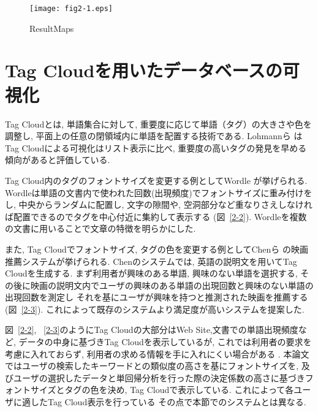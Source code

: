 \documentclass[sotsuron]{kuee}
\begin{document}

\begin{figure}
  \begin{center}
    \unitlength=1mm
   \texttt{[image: fig2-1.eps]}
  \end{center}
  \caption{ResultMaps}
  \label{2-1}
\end{figure}

\section{Tag Cloudを用いたデータベースの可視化}

Tag Cloudとは, 単語集合に対して, 重要度に応じて単語（タグ）の大きさや色を調整し, 平面上の任意の閉領域内に単語を配置する技術である.
Lohmannら
\cite{1-2}はTag Cloudによる可視化はリスト表示に比べ, 重要度の高いタグの発見を早める傾向があると評価している.

Tag Cloud内のタグのフォントサイズを変更する例としてWordle
\cite{2.2-3}が挙げられる.
Wordleは単語の文書内で使われた回数(出現頻度)でフォントサイズに重み付けをし, 中央からランダムに配置し,
文字の隙間や, 空洞部分など重なりさえしなければ配置できるのでタグを中心付近に集約して表示する
(図~\ref{2-2}).
Wordleを複数の文書に用いることで文章の特徴を明らかにした.

また, Tag Cloudでフォントサイズ, タグの色を変更する例としてChenら
\cite{2.2-2}の映画推薦システムが挙げられる.
Chenのシステムでは, 英語の説明文を用いてTag Cloudを生成する.
まず利用者が興味のある単語, 興味のない単語を選択する, その後に映画の説明文内でユーザの興味のある単語の出現回数と興味のない単語の出現回数を測定し
それを基にユーザが興味を持つと推測された映画を推薦する(図~\ref{2-3}). これによって既存のシステムより満足度が高いシステムを提案した.

図~\ref{2-2}, ~\ref{2-3}のようにTag Cloudの大部分はWeb Site,文書での単語出現頻度など, データの中身に基づきTag Cloudを表示しているが,
これでは利用者の要求を考慮に入れておらず, 利用者の求める情報を手に入れにくい場合がある
\cite{2.2-4}.
本論文ではユーザの検索したキーワードとの類似度の高さを基にフォントサイズを,
及びユーザの選択したデータと単回帰分析を行った際の決定係数の高さに基づきフォントサイズとタグの色を決め, Tag Cloudで表示している.
これによって各ユーザに適したTag Cloud表示を行っている
その点で本節でのシステムとは異なる.
\end{document}

